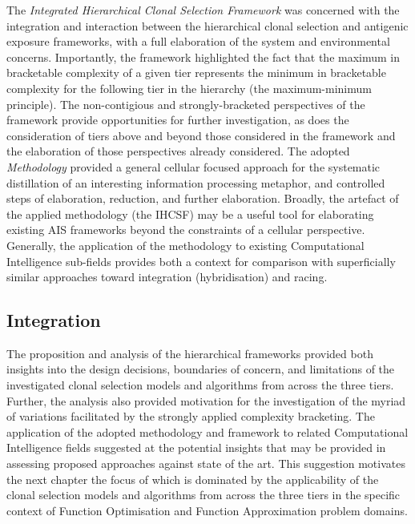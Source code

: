 The \emph{Integrated Hierarchical Clonal Selection Framework} was concerned with the integration and interaction between the hierarchical clonal selection and antigenic exposure frameworks, with a full elaboration of the system and environmental concerns. Importantly, the framework highlighted the fact that the maximum in bracketable complexity of a given tier represents the minimum in bracketable complexity for the following tier in the hierarchy (the maximum-minimum principle). The non-contigious and strongly-bracketed perspectives of the framework provide opportunities for further investigation, as does the consideration of tiers above and beyond those considered in the framework and the elaboration of those perspectives already considered.
The adopted \emph{Methodology} provided a general cellular focused approach for the systematic distillation of an interesting information processing metaphor, and controlled steps of elaboration, reduction, and further elaboration. Broadly, the artefact of the applied methodology (the IHCSF) may be a useful tool for elaborating existing AIS frameworks beyond the constraints of a cellular perspective. Generally, the application of the methodology to existing Computational Intelligence sub-fields provides both a context for comparison with superficially similar approaches toward integration (hybridisation) and racing.

%
%
\subsection{Integration}
The proposition and analysis of the hierarchical frameworks provided both insights into the design decisions, boundaries of concern, and limitations of the investigated clonal selection models and algorithms from across the three tiers. Further, the analysis also provided motivation for the investigation of the myriad of variations facilitated by the strongly applied complexity bracketing.
The application of the adopted methodology and framework to related Computational Intelligence fields suggested at the potential insights that may be provided in assessing proposed approaches against state of the art.
This suggestion motivates the next chapter the focus of which is dominated by the applicability of the clonal selection models and algorithms from across the three tiers in the specific context of Function Optimisation and Function Approximation problem domains.

